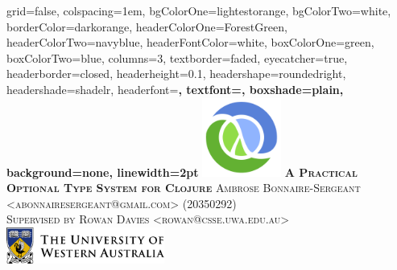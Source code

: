 \documentclass[landscape,final,a0paper,fontscale=0.277]{baposter}
\begin{document}
\begin{poster}%
  {
  grid=false,
  colspacing=1em,
  bgColorOne=lightestorange,
  bgColorTwo=white,
  borderColor=darkorange,
  headerColorOne=ForestGreen,
  headerColorTwo=navyblue,
  headerFontColor=white,
  boxColorOne=green,
  boxColorTwo=blue,
  columns=3,
  textborder=faded,
  eyecatcher=true,
  headerborder=closed,
  headerheight=0.1\textheight,
  headershape=roundedright,
  headershade=shadelr,
  headerfont=\Large\bf\textsc, %
  textfont={\setlength{\parindent}{1.5em}},
  boxshade=plain,
  background=none,
  linewidth=2pt
  }
  {\includegraphics[height=7em]{images/clojure-logo10.png}} 
  {\bf\textsc{A Practical Optional Type System for Clojure}}
  { \textsc{Ambrose Bonnaire-Sergeant <abonnairesergeant@gmail.com> (20350292)}
    \\
    \textsc{{Supervised by Rowan Davies <rowan@csse.uwa.edu.au>}}}
  {%
    \includegraphics[width=14em]{images/UWA_logo.png}
  }
%
%   


\end{poster}
\end{document}
